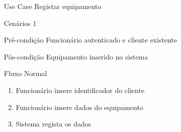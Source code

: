 \documentclass[../relatorio.tex]{subfiles}
\begin{document}
    \begin{itemize}
        \item[Use Case] {Registar equipamento}
        \item[Cenários] {1} 
        \item[Pré-condição] {Funcionário autenticado e cliente existente}
        \item[Pós-condição] {Equipamento inserido no sistema}
        \item[Fluxo Normal] {
            \begin{enumerate}
                \item Funcionário insere identificador do cliente
                \item Funcionário insere dados do equipamento
                \item Sistema regista os dados
            \end{enumerate}
        }
    \end{itemize}
\end{document}
